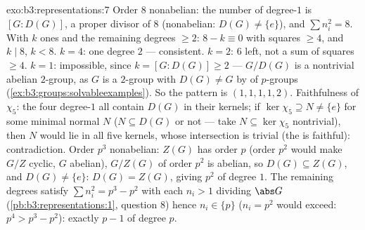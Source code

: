 \begin{solution}{exo:b3:representations:7}
Order $8$ nonabelian: the number of degree-$1$  is
$[G : D(G)]$, a proper divisor of $8$ (nonabelian: $D(G) \neq
\{e\}$), and $\sum n_i^2 = 8$. With $k$ ones and the remaining
degrees $\geq 2$: $8 - k \equiv 0$ with squares $\geq 4$, and $k
\mid 8$, $k < 8$. $k = 4$: one degree $2$ --- consistent. $k =
2$: $6$ left, not a sum of squares $\geq 4$. $k = 1$:
impossible, since $k = [G : D(G)] \geq 2$ --- $G/D(G)$ is a
nontrivial abelian $2$-group, as $G$ is a $2$-group with
$D(G) \neq G$ by  of $p$-groups
(\cref{ex:b3:groups:solvableexamples}). So the pattern is
$(1,1,1,1,2)$. Faithfulness of $\chi_5$: the four degree-$1$
 all contain $D(G)$ in their kernels; if $\ker\chi_5
\supseteq N \neq \{e\}$ for some minimal normal $N$ ($N
\subseteq D(G)$ or not --- take $N \subseteq \ker\chi_5$
nontrivial), then $N$ would lie in all five kernels, whose
intersection is trivial (the  is
faithful): contradiction. Order $p^3$ nonabelian: $Z(G)$ has
order $p$ (order $p^2$ would make $G/Z$ cyclic, $G$ abelian),
$G/Z(G)$ of order $p^2$ is abelian, so $D(G) \subseteq Z(G)$,
and $D(G) \ne \{e\}$: $D(G) = Z(G)$, giving $p^2$  of
degree $1$. The remaining degrees satisfy $\sum n_i^2 = p^3 -
p^2$ with each $n_i > 1$ dividing $\abs G$
(\cref{pb:b3:representations:1}, question 8) hence $n_i \in
\{p\}$ ($n_i = p^2$ would exceed: $p^4 > p^3 - p^2$): exactly $p
- 1$  of degree $p$.
\end{solution}


